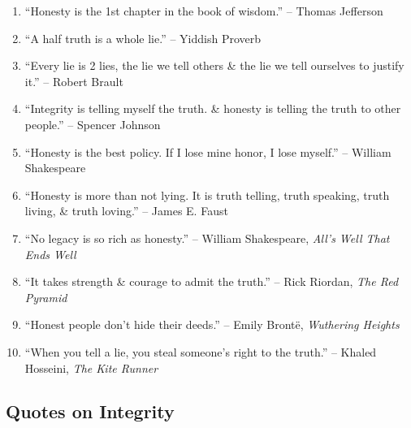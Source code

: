 \documentclass{article}
\begin{document}
\begin{enumerate}
	\item ``Honesty is the 1st chapter in the book of wisdom.'' -- Thomas Jefferson
	\item ``A half truth is a whole lie.'' -- Yiddish Proverb
	\item ``Every lie is 2 lies, the lie we tell others \& the lie we tell ourselves to justify it.'' -- Robert Brault
	\item ``Integrity is telling myself the truth. \& honesty is telling the truth to other people.'' -- Spencer Johnson
	\item ``Honesty is the best policy. If I lose mine honor, I lose myself.'' -- William Shakespeare
	\item ``Honesty is more than not lying. It is truth telling, truth speaking, truth living, \& truth loving.'' -- James E. Faust
	\item ``No legacy is so rich as honesty.'' -- William Shakespeare, \textit{All's Well That Ends Well}
	\item ``It takes strength \& courage to admit the truth.'' -- Rick Riordan, \textit{The Red Pyramid}
	\item ``Honest people don't hide their deeds.'' -- Emily Bront\"e, \textit{Wuthering Heights}
	\item ``When you tell a lie, you steal someone's right to the truth.'' -- Khaled Hosseini, \textit{The Kite Runner}
\end{enumerate}

\subsection{Quotes on Integrity}
\end{document}
